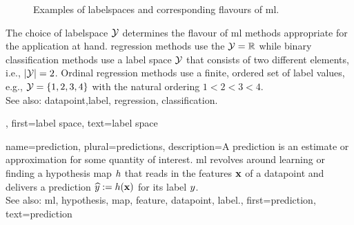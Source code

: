 {{\begin{figure}[H]
\begin{tikzpicture}[>=Stealth, font=\small]
		\end{tikzpicture}
		\caption{\label{fig_label_spaces_dict}	Examples of \glspl{labelspace} and corresponding flavours of 
		\gls{ml}.}
		\end{figure}
		The choice of \gls{labelspace} $\labelspace$ determines the flavour of \gls{ml} methods 
		appropriate for the application at hand. \Gls{regression} methods use the $\labelspace = \mathbb{R}$ while binary \gls{classification} methods 
		use a \gls{label} space $\labelspace$ that consists of two different 
		elements, i.e., $|\labelspace|=2$. Ordinal \gls{regression} methods use a finite, ordered set of 
		\gls{label} values, e.g., $\labelspace = \{1,2,3,4\}$ with the natural ordering $1 < 2 < 3 < 4$. 
					\\ 
		See also:  \gls{datapoint},\gls{label}, \gls{regression}, \gls{classification}.}, 
	first={label space},
	text={label space}  
}

{name={prediction}, plural={predictions},
	description={A prediction is an estimate or approximation for some 
		quantity of interest. \Gls{ml} revolves around learning or finding a \gls{hypothesis} \gls{map} $\hypothesis$ 
		that reads in the \glspl{feature} $\featurevec$ of a \gls{datapoint} and delivers a prediction 
		$\widehat{\truelabel} \defeq \hypothesis(\featurevec)$ for its \gls{label} $\truelabel$.
					\\ 
		See also: \gls{ml}, \gls{hypothesis}, \gls{map}, \gls{feature}, \gls{datapoint}, \gls{label}.},
	first={prediction},
	text={prediction}  
}

